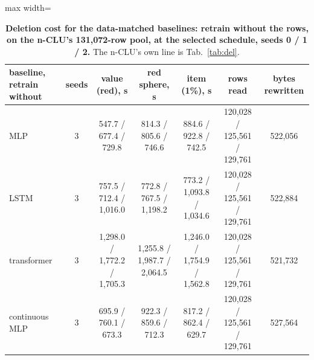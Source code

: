 \documentclass{article} %
\begin{document}
\begin{table}[h]
\centering\small
\caption{\textbf{Deletion cost for the data-matched baselines: retrain without the rows, on the n-CLU's %
131,072-row pool, at the selected schedule, seeds 0 / 1 / 2.} The n-CLU's own line is %
Tab.~\ref{tab:del}.}
\label{tab:rivals-del}
\setlength{\tabcolsep}{3pt}
\begin{adjustbox}{max width=\linewidth}\begin{tabular}{lcccccc}
\toprule
baseline, retrain without & seeds & value (red), s & red sphere, s & item (1\%), s & rows read & bytes rewritten \\
\midrule
MLP & 3 & 547.7 / 677.4 / 729.8 & 814.3 / 805.6 / 746.6 & 884.6 / 922.8 / 742.5 & 120,028 / 125,561 / 129,761 & 522,056 \\
LSTM & 3 & 757.5 / 712.4 / 1,016.0 & 772.8 / 767.5 / 1,198.2 & 773.2 / 1,093.8 / 1,034.6 & 120,028 / 125,561 / 129,761 & 522,884 \\
transformer & 3 & 1,298.0 / 1,772.2 / 1,705.3 & 1,255.8 / 1,987.7 / 2,064.5 & 1,246.0 / 1,754.9 / 1,562.8 & 120,028 / 125,561 / 129,761 & 521,732 \\
continuous MLP & 3 & 695.9 / 760.1 / 673.3 & 922.3 / 859.6 / 712.3 & 817.2 / 862.4 / 629.7 & 120,028 / 125,561 / 129,761 & 527,564 \\
\bottomrule
\end{tabular}\end{adjustbox}
\end{table}
\end{document}
